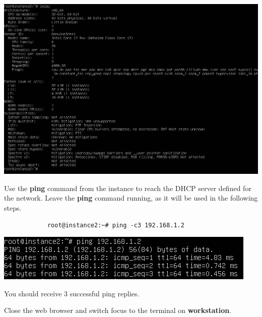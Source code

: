 \documentclass[letterpaper, 12pt]{article}
\begin{document}
\begin{enumerate}
\begin{labstep}
        \begin{center}
            \includegraphics[width=\linewidth]{images/part5/step9.png}
        \end{center}
    \end{labstep}

    \begin{labstep}
        Use the \textbf{ping} command from the instance to reach the DHCP server defined for the network.
        Leave the \textbf{ping} command running, as it will be used in the following steps.
        \begin{lstlisting}
            root@instance2:~# ping -c3 192.168.1.2
        \end{lstlisting}

        \begin{center}
            \includegraphics[width=\linewidth]{images/part5/step10.png}
        \end{center}
    \end{labstep}

    \begin{notebox}
        You should receive 3 successful ping replies.
    \end{notebox}

    \begin{labstep}
        Close the web browser and switch focus to the terminal on \textbf{workstation}.
    \end{labstep}


\end{enumerate}
\end{document}
